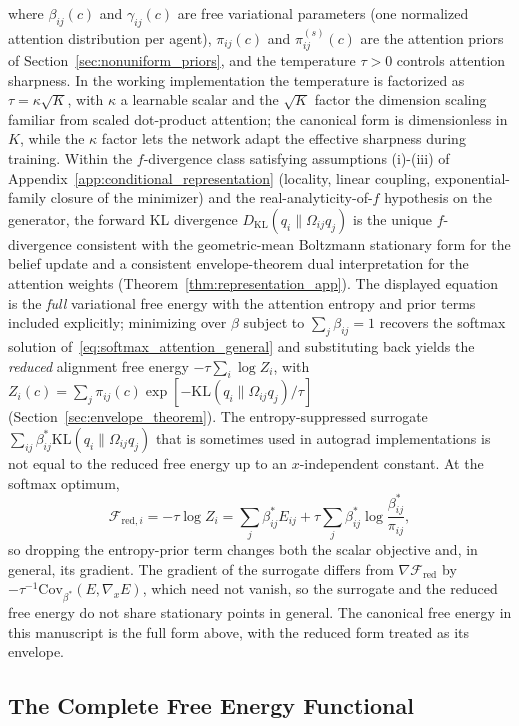 \documentclass[11pt]{article}
\begin{document}
where $\beta_{ij}(c)$ and $\gamma_{ij}(c)$ are free variational parameters (one normalized attention distribution per agent), $\pi_{ij}(c)$ and $\pi^{(s)}_{ij}(c)$ are the attention priors of Section~\ref{sec:nonuniform_priors}, and the temperature $\tau > 0$ controls attention sharpness. In the working implementation the temperature is factorized as $\tau = \kappa\sqrt{K}$, with $\kappa$ a learnable scalar and the $\sqrt{K}$ factor the dimension scaling familiar from scaled dot-product attention; the canonical form is dimensionless in $K$, while the $\kappa$ factor lets the network adapt the effective sharpness during training. Within the $f$-divergence class satisfying assumptions (i)-(iii) of Appendix~\ref{app:conditional_representation} (locality, linear coupling, exponential-family closure of the minimizer) and the real-analyticity-of-$f$ hypothesis on the generator, the forward KL divergence $D_{\mathrm{KL}}(q_i \| \Omega_{ij}q_j)$ is the unique $f$-divergence consistent with the geometric-mean Boltzmann stationary form for the belief update and a consistent envelope-theorem dual interpretation for the attention weights (Theorem~\ref{thm:representation_app}). The displayed equation is the \emph{full} variational free energy with the attention entropy and prior terms included explicitly; minimizing over $\beta$ subject to $\sum_j \beta_{ij} = 1$ recovers the softmax solution of~\eqref{eq:softmax_attention_general} and substituting back yields the \emph{reduced} alignment free energy $-\tau \sum_i \log Z_i$, with $Z_i(c) = \sum_j \pi_{ij}(c)\exp[-\mathrm{KL}(q_i \| \Omega_{ij}q_j)/\tau]$ (Section~\ref{sec:envelope_theorem}). The entropy-suppressed surrogate $\sum_{ij}\beta^*_{ij}\mathrm{KL}(q_i \| \Omega_{ij}q_j)$ that is sometimes used in autograd implementations is not equal to the reduced free energy up to an $x$-independent constant. At the softmax optimum,
\[
\mathcal{F}_{\mathrm{red},i}
= -\tau \log Z_i
= \sum_j \beta^*_{ij}E_{ij}
+ \tau\sum_j \beta^*_{ij}\log\frac{\beta^*_{ij}}{\pi_{ij}},
\]
so dropping the entropy-prior term changes both the scalar objective and, in general, its gradient. The gradient of the surrogate differs from $\nabla \mathcal{F}_{\mathrm{red}}$ by $-\tau^{-1}\mathrm{Cov}_{\beta^*}(E,\nabla_x E)$, which need not vanish, so the surrogate and the reduced free energy do not share stationary points in general. The canonical free energy in this manuscript is the full form above, with the reduced form treated as its envelope.

\subsection{The Complete Free Energy Functional}
\label{sec:complete_free_energy}
\end{document}
